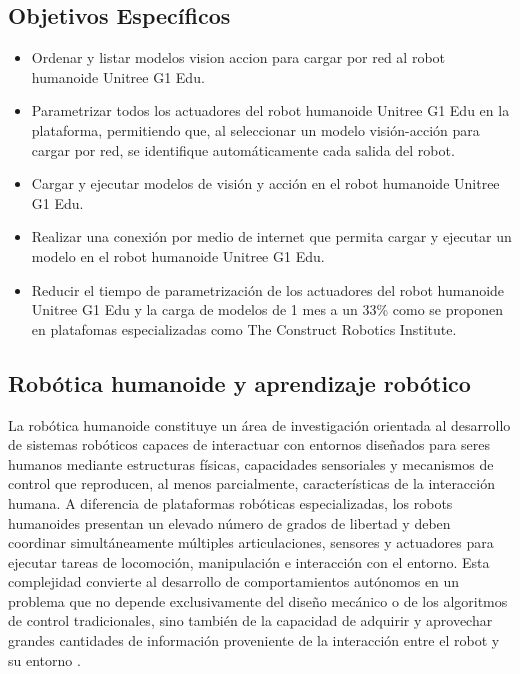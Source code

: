 \documentclass[stu,12pt,floatsintext]{apa7}
\begin{document}
\subsection{Objetivos Específicos}
\begin{itemize}
    \item Ordenar y listar modelos vision accion para cargar por red al robot humanoide Unitree G1 Edu.
    \item Parametrizar todos los actuadores del robot humanoide Unitree G1 Edu en la plataforma, permitiendo que, al seleccionar un modelo visión-acción para cargar por red, se identifique automáticamente cada salida del robot.
    \item Cargar y ejecutar modelos de visión y acción en el robot humanoide Unitree G1 Edu.
    \item Realizar una conexión por medio de internet que permita cargar y ejecutar un modelo en el robot humanoide Unitree G1 Edu.
    \item Reducir el tiempo de parametrización de los actuadores del robot humanoide Unitree G1 Edu y la carga de modelos de 1 mes a un 33\% como se proponen en platafomas especializadas como The Construct Robotics Institute. 
\end{itemize}

\clearpage

\subsection{Robótica humanoide y aprendizaje robótico}

La robótica humanoide constituye un área de investigación orientada al desarrollo de sistemas robóticos capaces de interactuar con entornos diseñados para seres humanos mediante estructuras físicas, capacidades sensoriales y mecanismos de control que reproducen, al menos parcialmente, características de la interacción humana. A diferencia de plataformas robóticas especializadas, los robots humanoides presentan un elevado número de grados de libertad y deben coordinar simultáneamente múltiples articulaciones, sensores y actuadores para ejecutar tareas de locomoción, manipulación e interacción con el entorno. Esta complejidad convierte al desarrollo de comportamientos autónomos en un problema que no depende exclusivamente del diseño mecánico o de los algoritmos de control tradicionales, sino también de la capacidad de adquirir y aprovechar grandes cantidades de información proveniente de la interacción entre el robot y su entorno \parencite{seo2025learningsimtorealhumanoidlocomotion}.
\end{document}
